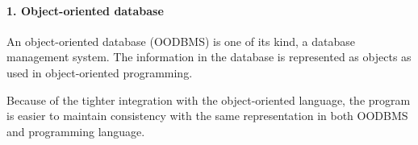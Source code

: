 
\paragraph{1. Object-oriented database}
An object-oriented database (OODBMS) is one of its kind, a database management system.\cite{WiKiauthor2013} The information in the database is represented as objects as used in object-oriented programming.

Because of the tighter integration with the object-oriented language, the program is easier to maintain consistency with the same representation in both OODBMS and programming language.

